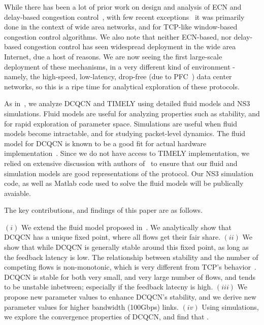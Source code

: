 
While there has been a lot of prior work on design and analysis of ECN and
delay-based congestion control~\cite{ecn, tcp-vegas, Hollot:PIController}, with few
recent exceptions~\cite{dctcp-analysis, qcn-analysis} it was primarily done in
the context of wide area networks, and for TCP-like window-based congestion
control algorithms.  We also note that neither ECN-based, nor delay-based
congestion control has seen widespread deployment in the wide area Internet, due
a host of reasons. We are now seeing the first large-scale deployment of these
mechanisms, in a very different kind of environment - namely, the high-speed,
low-latency, drop-free (due to PFC~\cite{pfc}) data center networks, so this is
a ripe time for analytical exploration of these protocols.


As in~\cite{dctcp-analysis, qcn-analysis}, we analyze DCQCN and TIMELY using
detailed fluid models and NS3 simulations. Fluid models are useful for analyzing
properties such as stability, and for rapid exploration of parameter space.
Simulations are useful when fluid models become intractable, and for studying
packet-level dynamics. The fluid model for DCQCN is known to be a good fit for
actual hardware implementation~\cite{dcqcn}. Since we do not have access to
TIMELY implementation, we relied on extensive discussion with authors
of~\cite{timely} to ensure that our fluid and simulation models are good
representations of the protocol. Our NS3 simulation code, as well as Matlab code
used to solve the fluid models will be publically avaiable.


The key contributions, and findings of this paper are as follows.

 $(i)$ We extend the fluid model proposed in~\cite{dcqcn}. We
analytically show that DCQCN has a unique fixed point, where all flows get their
fair share. $(ii)$ We show that while DCQCN is generally stable around this
fixed point, as long as the feedback latency is low. The relationship between
stability and the number of competing flows is non-monotonic, which is very
different from TCP's behavior~\cite{Hollot:PIController}. DCQCN is stable for
both very small, and very large number of flows, and tends to be unstable
inbetween; especially if the feedback latecny is high.  $(iii)$ We propose new
parameter values to enhance DCQCN's stability, and we derive new parameter
values for higher bandwidth (100Gbps) links. $(iv)$ Using simulations, we
explore the convergence properties of DCQCN, and find that .

